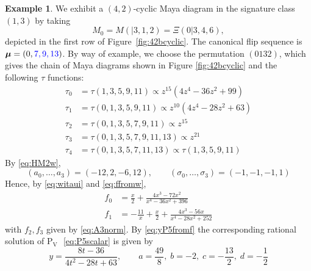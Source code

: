 \documentclass{amsart}
\theoremstyle{definition}
\newtheorem*{example}{Example} %
\newcommand{\bmu}{{\boldsymbol{\mu}}}
\newcommand{\PV}{$\mathrm{P}_{\mathrm{V}}\,\,$}
\begin{document}
\begin{example}\label{ex:42b}
  We exhibit a $(4,2)$-cyclic Maya diagram in the signature class
  $(1,3)$ by taking
  \[M_0=M(|3,1,2)=\Xi(0|3,4,6),\] depicted in the first row of
  Figure~\ref{fig:42bcyclic}.  The canonical flip sequence is
  $\bmu=(0,{\color{blue} 7,9,13})$.  By way of example, we choose the
  permutation  
  $(0132)$, which gives the chain of Maya diagrams shown in Figure
  \ref{fig:42bcyclic} and the following $\tau$ functions:
  \begin{align*}
    \tau_0 &= \tau(1,3,5,9,11) \propto z^{15}(4z^4-36z^2+99)\\
    \tau_1 &= \tau(0,1,3,5,9,11)\propto z^{10}(4z^4-28z^2+63) \\
    \tau_2 &= \tau(0,1,3,5,7,9,11)\propto z^{15}\\
    \tau_3 &= \tau(0,1,3,5,7,9,11,13)\propto z^{21}\\
    \tau_4 &= \tau(0,1,3,5,7,11,13)\propto \tau(1,3,5,9,11)
  \end{align*}
  By \eqref{eq:HM2w},
  \[ (a_0,\ldots, a_3) = (-12,2,-6,12),\qquad (\sigma_0,\ldots,
    \sigma_3) = (-1,-1,-1,1) \] Hence, by \eqref{eq:witaui} and
  \eqref{eq:ffromw},
  \[
    \begin{aligned}
      f_0 &= \frac{x}{2} + \frac{4x^3-72x^2}{x^4-36x^2+396}\\
      f_1 &= -\frac{11}{x} +\frac{x}{2}+ \frac{4x^3-56x}{x^4-28x^2+252}
    \end{aligned}\] with $f_2,f_3$ given by \eqref{eq:A3norm}. By
  \eqref{eq:yP5fromf} the corresponding rational solution of \PV
  \eqref{eq:P5scalar} is given by
  \[
    y = \frac{8t-36}{4t^2-28t+63},\qquad a= \frac{49}{8},\; b= -2,\;
    c= -\frac{13}{2},\; d= -\frac12
    \]

  \begin{figure}[ht]
    \centering
\end{figure}
\end{example}
\end{document}
